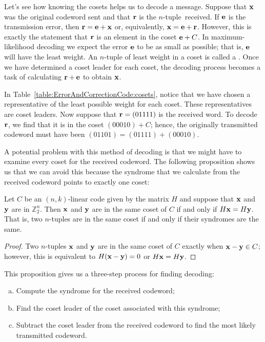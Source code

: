  
Let's see how knowing the cosets helps us to decode a
message. Suppose that ${\bold x}$ was the original codeword sent and
that ${\bold r}$ is the \mbox{$n$-tuple received}. If ${\bold e}$ is the
transmission error, then ${\bold r} = {\bold e} + {\bold x}$ or,
equivalently, ${\bold x} = {\bold e} + {\bold r}$. However, this is
exactly the statement that ${\bold r}$ is an element in the coset 
${\bold e} + C$. In maximum-likelihood decoding we expect the error
${\bold e}$ to be as small as possible; that is, ${\bold e}$ will have
the least weight. An $n$-tuple of least weight in a coset is called a
. Once we have determined a
coset leader for each coset, the decoding process becomes a task
of calculating ${\bold r} + {\bold e}$ to obtain ${\bold x}$.
 
 
\begin{example}{}
In Table~\ref{table:ErrorAndCorrectionCode:cosets}, notice that we have chosen a representative of the least
possible weight for each coset.  These representatives are coset
leaders. Now suppose that ${\bold r} = (01111)$ is the received word.
To decode ${\bold r}$, we find that it is in the coset $(00010) + C$;
hence, the originally transmitted codeword must have been $(01101) =
(01111) + (00010)$. 
\end{example}
 
 
A potential problem with this method of decoding is that we might have
to examine every coset for the received codeword. The following
proposition shows us that we can avoid this because the syndrome
that we  calculate from the received codeword points to exactly one coset:

 \begin{prop}{}
Let $C$ be an $(n,k)$-linear code given by the matrix $H$ and suppose
that ${\bold x}$ and ${\bold y}$ are in $\mathbb{Z}_2^n$. Then ${\bold
x}$ and ${\bold y}$ are in the same coset of $C$ if and only if
$H{\bold x} = H{\bold y}$. That is, two $n$-tuples are in the same
coset if and only if their syndromes are the same.
\end{prop}
 
 \begin{proof}
Two $n$-tuples ${\bold x}$ and ${\bold y}$ are in the same coset of
$C$ exactly when ${\bold x} - {\bold y} \in C$; however, this is
equivalent to $H({\bold x} - {\bold y}) = 0$ or $H {\bold x} = H
{\bold y}$. 
\end{proof}

This proposition gives us a three-step process for finding decoding:
\begin{enumerate}[(a)]
\item
Compute the syndrome for the received codeword;
\item
Find the coset leader of the coset associated with this syndrome;
\item
Subtract the coset leader from the received codeword to find the most likely transmitted codeword.
\end{enumerate}

